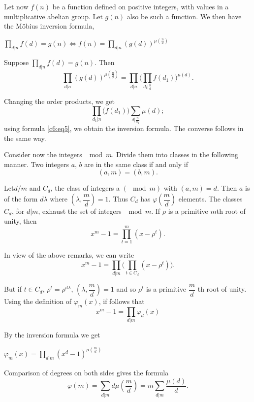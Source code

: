 Let now $f (n)$ be a function defined on positive integers, with
values in a multiplicative abelian group. Let $g(n)$ also be such a
function. We then have the M\"obius inversion formula, 
\begin{center}
\begin{fbox}
{$\prod\limits_{d|n} f (d) = g (n) \Longleftrightarrow f (n)
  =\prod\limits_{d|n} (g(d))^{\mu(\frac{n}{d})}$}
\end{fbox}
\end{center}

Suppose $\prod\limits_{d|n} f(d) = g(n)$. Then 
$$
\prod_{d|n} (g (d))^{\mu(\frac{n}{g})} = \prod\limits_{d|n}
\bigg(\prod_{d_i |\frac{n}{d}} f(d_1)\bigg)^{\mu(d)}. 
$$
 
Changing the order products, we get 
$$
\prod_{d_1|n} \big(f (d_1)\big) \sum_{d|\frac{n}{d_1}} \mu(d);
$$
using formula \eqref{c6:eq5}, we obtain the inversion formula. The converse
follows in the same way.  

Consider now the integers $\mod m$. Divide them into classes in the
following manner. Two integers $a$, $b$ are in the same class if and
only if 
$$
(a, m) = (b, m).
$$

Let\pageoriginale $d/m$ and $C_d$, the class of integers a $(\mod m)$
with $(a,m) = 
d$. Then $a$ is of the form $d \lambda$ where $(\lambda, \dfrac{m}{d})
= 1$. Thus $C_d$ has $\varphi (\dfrac{m}{d})$ elements. The classes
$C_d$, for $d|m$, exhaust the set of integers $\mod m$. If $\rho$ is a
primitive $m$th root of unity, then 
$$
x^m -1 =\prod_{t =1}^m (x - \rho^t).
$$

In view of the above remarks, we can write 
$$
x^m-1 = \prod_{d|m} \bigg(\prod_{ t \in C_d} (x-\rho^t)\bigg).
$$

But if $t \in C_d$, $\rho^t = \rho^{d \lambda}$, $(\lambda,
\dfrac{m}{d}) =1$ and so $\rho^t$ is a primitive $\dfrac{m}{d}$ th
root of unity. Using the definition of $\varphi_m (x)$, if follows
that   
$$
x^m-1 =\prod_{d|m} \varphi_d (x)
$$

By the inversion formula we get
\begin{center}
\begin{fbox}
{$\varphi_m (x) = \prod\limits_{d|m} (x^d -1)^{\mu(\frac{m}{d})}$}
\end{fbox}
\end{center}

Comparison of degrees on both sides gives the formula
$$
\varphi(m) = \sum_{d|m} d \mu (\frac{m}{d}) = m \sum_{d|m} \frac{\mu
  (d)} {d}. 
$$


